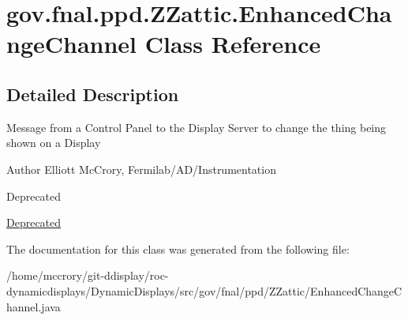 \hypertarget{classgov_1_1fnal_1_1ppd_1_1ZZattic_1_1EnhancedChangeChannel}{\section{gov.\-fnal.\-ppd.\-Z\-Zattic.\-Enhanced\-Change\-Channel Class Reference}
\label{classgov_1_1fnal_1_1ppd_1_1ZZattic_1_1EnhancedChangeChannel}
}


\subsection{Detailed Description}
Message from a Control Panel to the Display Server to change the thing being shown on a Display

\begin{DoxyAuthor}{Author}
Elliott Mc\-Crory, Fermilab/\-A\-D/\-Instrumentation 
\end{DoxyAuthor}
\begin{DoxyRefDesc}{Deprecated}
\item[\hyperlink{deprecated__deprecated000011}{Deprecated}]\end{DoxyRefDesc}


The documentation for this class was generated from the following file\-:\begin{DoxyCompactItemize}
\item 
/home/mccrory/git-\/ddisplay/roc-\/dynamicdisplays/\-Dynamic\-Displays/src/gov/fnal/ppd/\-Z\-Zattic/Enhanced\-Change\-Channel.\-java\end{DoxyCompactItemize}
